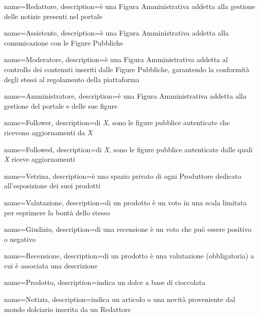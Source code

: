 {
    name={Redattore},
    description={è una Figura Amministrativa addetta alla gestione delle notizie presenti nel portale}
}

{
    name={Assistente},
    description={è una Figura Amministrativa addetta alla comunicazione con le Figure Pubbliche}
}

{
    name={Moderatore},
    description={è una Figura Amministrativa addetta al controllo dei contenuti inseriti dalle Figure Pubbliche, garantendo la conformità degli stessi al regolamento della piattaforma}
}

{
    name={Amministratore},
    description={è una Figura Amministrativa addetta alla gestione del portale e delle sue figure}
}

{
    name={Follower},
    description={di \emph{X}, sono le figure pubblice autenticate che ricevono aggiornamenti da \emph{X}}
}

{
    name={Followed},
    description={di \emph{X}, sono le figure pubblice autenticate dalle quali \emph{X} riceve aggiornamenti}
}

{
    name={Vetrina},
    description={è uno spazio privato di ogni Produttore dedicato all'esposizione dei suoi prodotti}
}

{
    name={Valutazione},
    description={di un prodotto è un voto in una scala limitata per esprimere la bontà dello stesso}
}

{
    name={Giudizio},
    description={di una recensione è un voto che può essere positivo o negativo}
}

{
    name={Recensione},
    description={di un prodotto è una valutazione (obbligatoria) a cui è associata una descrizione}
}

{
    name={Prodotto},
    description={indica un dolce a base di cioccolata}
}

{
    name={Notizia},
    description={indica un articolo o una novità proveniente dal mondo dolciario inserita da un Redattore}
}








